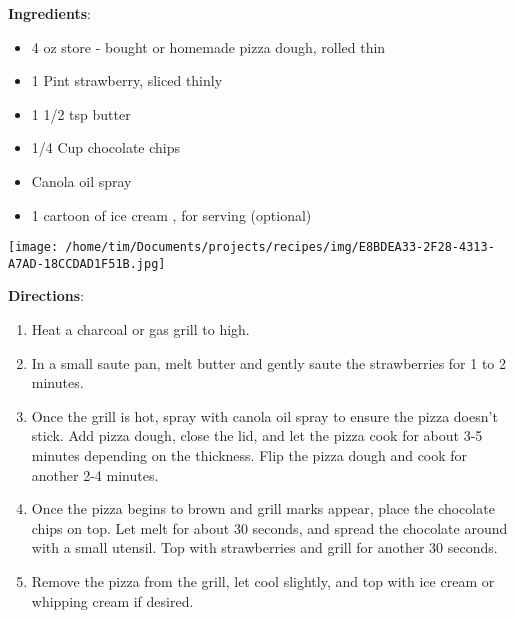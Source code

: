 \documentclass[11pt, twoside, openany]{book}
\begin{document}
\begin{minipage}[t]{0.8\linewidth}
\textbf{Ingredients}:\vspace{-3mm}
\begin{multicols}{2}
\begin{itemize}\setlength\itemsep{-1mm}
\item 4 oz store - bought or homemade pizza dough, rolled thin
\item 1 Pint strawberry, sliced thinly
\item 1 1/2 tsp butter
\item 1/4 Cup chocolate chips
\item Canola oil spray
\item 1 cartoon of ice cream , for serving (optional)
\end{itemize}
\end{multicols}
\end{minipage}
\begin{minipage}[t]{0.2\linewidth}
\centering \strut\vspace*{-\baselineskip}\newline
\texttt{[image: /home/tim/Documents/projects/recipes/img/E8BDEA33-2F28-4313-A7AD-18CCDAD1F51B.jpg]}\\
\end{minipage}\vspace{3mm}
\textbf{Directions}:
\vspace{-3mm}\begin{enumerate}\setlength\itemsep{-1mm}
\item Heat a charcoal or gas grill to high.
\item In a small saute pan, melt butter and gently saute the strawberries for 1 to 2 minutes.
\item Once the grill is hot, spray with canola oil spray to ensure the pizza doesn't stick. Add pizza dough, close the lid, and let the pizza cook for about 3-5 minutes depending on the thickness. Flip the pizza dough and cook for another 2-4 minutes.
\item Once the pizza begins to brown and grill marks appear, place the chocolate chips on top. Let melt for about 30 seconds, and spread the chocolate around with a small utensil. Top with strawberries and grill for another 30 seconds.
\item Remove the pizza from the grill, let cool slightly, and top with ice cream or whipping cream if desired.
\end{enumerate}
 \label{pizza-dough}\hfill\textit{}\\
\end{document}
